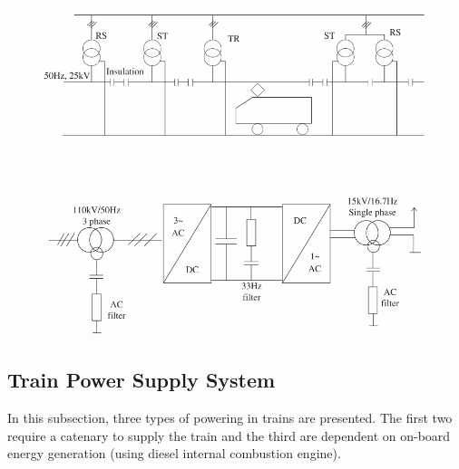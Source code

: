 \begin{figure}[h!]
	\centering
	\begin{minipage}{.45\textwidth}
		\centering
		\includegraphics[width=\textwidth,keepaspectratio]{figures/31.PowerS/abad2016d}
		\label{fig:abad2016d}
	\end{minipage}%
	\begin{minipage}{.03\textwidth}  ~\end{minipage}	
	\begin{minipage}{.45\textwidth}
		\centering
		\includegraphics[width=\textwidth,keepaspectratio]{figures/31.PowerS/abad2016e}
		\label{fig:abad2016e}
	\end{minipage}
\end{figure}



\subsection{Train Power Supply System}
\label{subs:313}
In this subsection, three types of powering in trains are presented. The first two require a catenary to supply the train and the third are dependent on on-board energy generation (using diesel internal combustion engine).


